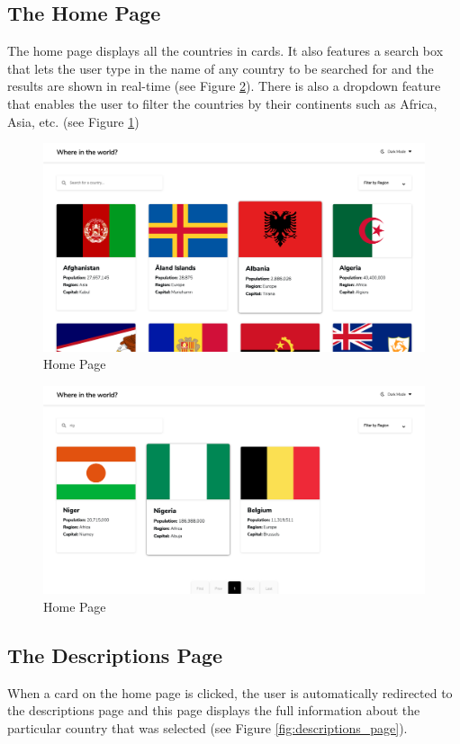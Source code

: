\documentclass[twoside, a4paper, 12pt]{report}
\begin{document}
\subsection{The Home Page}
The home page displays all the countries in cards. It also features a search box that lets the user type in the name of any country to be searched for and the results are shown in real-time (see Figure \ref{fig:search}). There is also a dropdown feature that enables the user to filter the countries by their continents such as Africa, Asia, etc. (see Figure \ref{fig:home_page})

\begin{figure} [ht]
	\centering
	\includegraphics[width=1.0\textwidth]{Home Page.png}
	\caption{Home Page}
	\label{fig:home_page}
\end{figure}

\begin{figure}
	\centering
	\includegraphics[width=1.0\textwidth]{search.png}
	\caption{Home Page}
	\label{fig:search}
\end{figure}

\subsection{The Descriptions Page}
When a card on the home page is clicked, the user is automatically redirected to the descriptions page and this page displays the full information about the particular country that was selected (see Figure \ref{fig:descriptions_page}).
\end{document}
